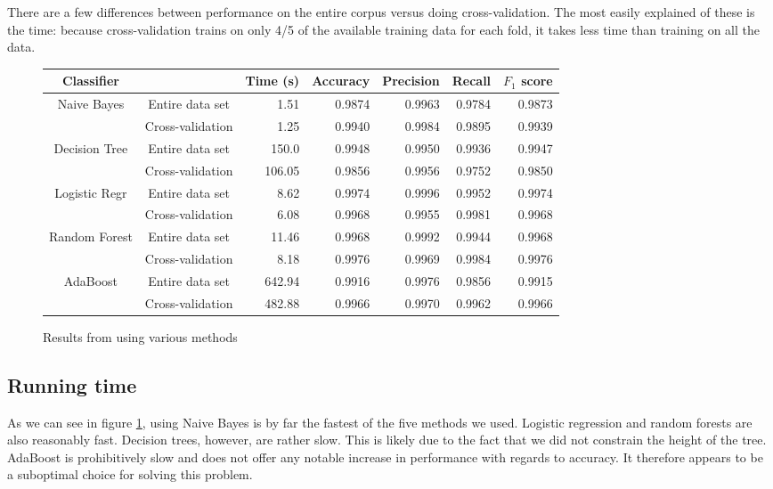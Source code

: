 \documentclass{article} %
\begin{document}
There are a few differences between performance on the entire corpus versus doing cross-validation. The most easily explained of these is the time: because cross-validation trains on only 4/5 of the available training data for each fold, it takes less time than training on all the data. 

\begin{figure}[h]
  \begin{tabular}[h]{ | c | c | r | r | r | r | r | }
    \hline
    Classifier    &                  & Time (s) & Accuracy & Precision & Recall & $F_1$ score  \\ \hline
    Naive Bayes   & Entire data set  & 1.51     & 0.9874   & 0.9963    & 0.9784 & 0.9873 \\ \cline{2-7}
                  & Cross-validation & 1.25     & 0.9940   & 0.9984    & 0.9895 & 0.9939 \\ \hline
    Decision Tree & Entire data set  & 150.0    & 0.9948   & 0.9950    & 0.9936 & 0.9947 \\ \cline{2-7}
                  & Cross-validation & 106.05   & 0.9856   & 0.9956    & 0.9752 & 0.9850 \\ \hline
    Logistic Regr & Entire data set  & 8.62     & 0.9974   & 0.9996    & 0.9952 & 0.9974 \\ \cline{2-7}
                  & Cross-validation & 6.08     & 0.9968   & 0.9955    & 0.9981 & 0.9968 \\ \hline
    Random Forest & Entire data set  & 11.46    & 0.9968   & 0.9992    & 0.9944 & 0.9968 \\ \cline{2-7}
                  & Cross-validation & 8.18     & 0.9976   & 0.9969    & 0.9984 & 0.9976 \\ \hline
    AdaBoost      & Entire data set  & 642.94   & 0.9916   & 0.9976    & 0.9856 & 0.9915 \\ \cline{2-7}
                  & Cross-validation & 482.88   & 0.9966   & 0.9970    & 0.9962 & 0.9966 \\ \hline
  \end{tabular}
  \caption{Results from using various methods}
  \label{fig:table}
\end{figure}

\subsection{Running time}
As we can see in figure \ref{fig:table}, using Naive Bayes is by far the fastest of the five methods we used. Logistic regression and random forests are also reasonably fast. Decision trees, however, are rather slow. This is likely due to the fact that we did not constrain the height of the tree. AdaBoost is prohibitively slow and does not offer any notable increase in performance with regards to accuracy. It therefore appears to be a suboptimal choice for solving this problem. 
\end{document}

